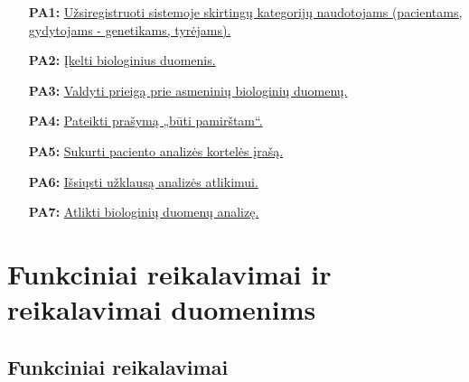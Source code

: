 \documentclass[12pt]{article}
\begin{document}
\begin{enumerate}[itemsep=0.5pt]
    \item[\textbf{PA1:}] \hyperlink{FR1}{\hypertarget{PA1}{Užsiregistruoti
    sistemoje skirtingų kategorijų naudotojams (pacientams, gydytojams -
    genetikams, tyrėjams).}}
    \item[\textbf{PA2:}] \hyperlink{FR2}{\hypertarget{PA2}{Įkelti biologinius
    duomenis.}}
    \item[\textbf{PA3:}] \hyperlink{FR3}{\hypertarget{PA3}{Valdyti prieigą prie
    asmeninių biologinių duomenų.}}
    \item[\textbf{PA4:}] \hyperlink{FR4}{\hypertarget{PA4}{Pateikti prašymą
    „būti pamirštam“.}}
    \item[\textbf{PA5:}] \hyperlink{FR5}{\hypertarget{PA5}{Sukurti paciento
    analizės kortelės įrašą.}}
    \item[\textbf{PA6:}] \hyperlink{FR6}{\hypertarget{PA6}{Išsiųsti užklausą
    analizės atlikimui.}}
    \item[\textbf{PA7:}] \hyperlink{FR7}{\hypertarget{PA7}{Atlikti biologinių
    duomenų analizę.}}
\end{enumerate}
\newpage

\section{Funkciniai reikalavimai ir reikalavimai duomenims}
\subsection{Funkciniai reikalavimai}
\end{document}
